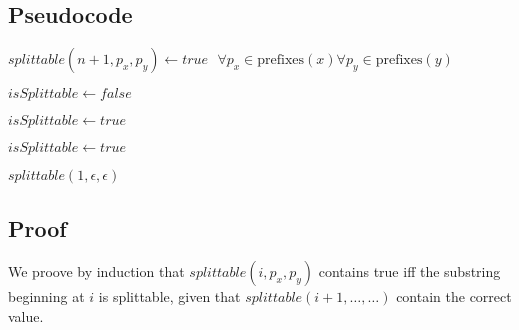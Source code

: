 \documentclass[12pt]{article}
\begin{document}
\subsection*{Pseudocode}
\begin{algorithmic}
	\State $\mathit{splittable}(n+1, p_x, p_y) \gets \mathit{true} \mbox{  } \forall p_x \in \mbox{prefixes}(x) \forall p_y \in \mbox{prefixes}(y)$

				\State $\mathit{isSplittable} \gets \mathit{false}$

					\State $\mathit{isSplittable} \gets \mathit{true}$
				\EndIf

					\State $\mathit{isSplittable} \gets \mathit{true}$
				\EndIf
			\EndFor
		\EndFor
	\EndFor

	\Return $\mathit{splittable}(1, \epsilon, \epsilon)$
\end{algorithmic}

\subsection*{Proof}
We proove by induction that $\mathit{splittable}(i, p_x, p_y)$ contains \mbox{true} iff the substring beginning at $i$ is splittable, given that $\mathit{splittable}(i+1, \ldots, \ldots)$ contain the correct value.
\end{document}
